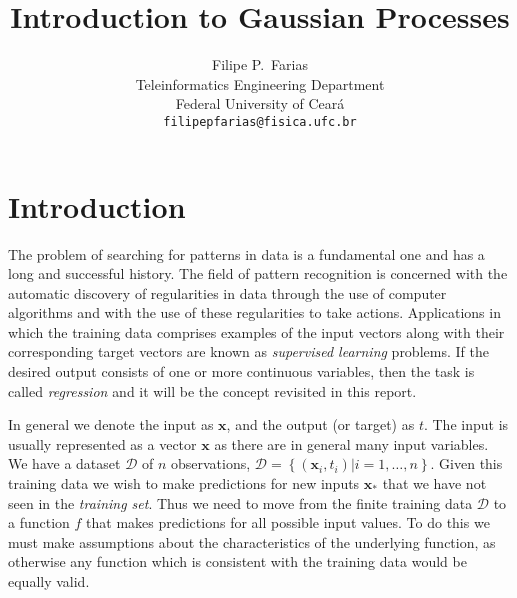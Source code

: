 \documentclass[11pt]{article} %
\title{Introduction to Gaussian Processes}
\author{
Filipe P.~Farias \\
Teleinformatics Engineering Department\\
Federal University of Ceará\\
\texttt{filipepfarias@fisica.ufc.br} \\
}
\begin{document}
\maketitle


\section{Introduction}

The problem of searching for patterns in data is a fundamental one and has a long and successful history. The field of pattern recognition is concerned with the automatic discovery of regularities in data through the use of computer algorithms and with the use of these regularities to take actions. Applications in which the training data comprises examples of the input vectors along with their corresponding target vectors are known as \textit{supervised learning} problems. If the desired output consists of one or more continuous variables, then the task is called \textit{regression} \cite{Bishop:2006:PRM:1162264} and it will be the concept revisited in this report.

In general we denote the input as $\mathbf{x}$, and the output (or target) as $t$. The input is usually represented as a vector $\mathbf{x}$ as there are in general many input variables. We have a dataset $\mathcal{D}$ of $n$ observations, $\mathcal{D}=\left\{\left(\mathbf{x}_{i}, t_{i}\right) | i=1, \ldots, n\right\}$. Given this training data we wish to make predictions for new inputs $\mathbf{x_*}$ that we have not seen in the \textit{training set}. Thus we need to move from the finite training data $\mathcal{D}$ to a function $f$ that makes predictions for all possible input values. To do this we must make assumptions about the characteristics of the underlying function, as otherwise any function which is consistent with the training data would be equally valid.
\end{document}
